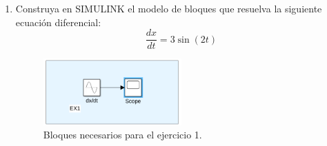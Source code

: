 \documentclass[12pt, letterpaper]{article}
\begin{document}
\begin{enumerate}
	\item Construya en SIMULINK el modelo de bloques que resuelva la siguiente ecuación diferencial:
		\begin{equation}
			\frac{dx}{dt} = 3 \sin (2t)
		\end{equation}
		\begin{figure}[H]
			\centering
			\includegraphics[width=0.5\textwidth]{1.png}
			\caption{Bloques necesarios para el ejercicio 1.}
		\end{figure}


\end{enumerate}
\end{document}
